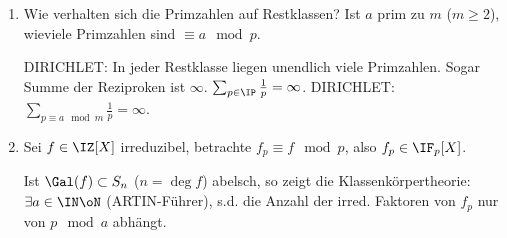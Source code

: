 \begin{Bemerkung}
 \begin{enumerate}
  \item Wie verhalten sich die Primzahlen auf Restklassen? Ist $a$ prim zu $m$ ($m\geq 2$), wieviele Primzahlen sind $\equiv a\mod{p}$.
  
  DIRICHLET: In jeder Restklasse liegen unendlich viele Primzahlen. Sogar Summe der Reziproken ist $\infty$. $\sum_{p\in\IP}\frac{1}{p}=\infty$. DIRICHLET: $\sum_{p\equiv a\mod{m}} \frac{1}{p}=\infty$.
  \item Sei $f\in\IZ[X]$ irreduzibel, betrachte $f_p\equiv f\mod{p}$, also $f_p\in\IF_p[X]$.
  
  Ist $\Gal(f)\subset S_n$ ($n=\deg f$) abelsch, so zeigt die Klassenkörpertheorie: $\exists a\in\IN\oN$ (ARTIN-Führer), s.d. die Anzahl der irred. Faktoren von $f_p$ nur von $p\mod a$ abhängt.
 \end{enumerate}
\end{Bemerkung}

